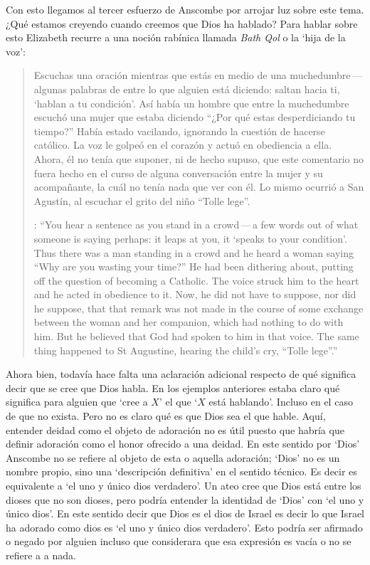 Con esto llegamos al tercer esfuerzo de Anscombe por arrojar luz sobre este tema. ¿Qué estamos creyendo cuando creemos que Dios ha hablado? Para hablar sobre esto Elizabeth recurre a una noción rabínica llamada \emph{Bath Qol} o la `hija de la voz': \blockquote[{\cite[118--119]{anscombe1981erp:faith}}: \enquote{You hear a sentence as you stand in a crowd\,---\,a few words out of what someone is saying perhaps: it leaps at you, it `speaks to your condition'. Thus there was a man standing in a crowd and he heard a woman saying ``Why are you wasting your time?'' He had been dithering about, putting off the question of becoming a Catholic. The voice struck him to the heart and he acted in obedience to it. Now, he did not have to suppose, nor did he suppose, that that remark was not made in the course of some exchange between the woman and her companion, which had nothing to do with him. But he believed that God had spoken to him in that voice. The same thing happened to St Augustine, hearing the child's cry, ``Tolle lege''.}]{Escuchas una oración mientras que estás en medio de una muchedumbre\,---\,algunas palabras de entre lo que alguien está diciendo: saltan hacia ti, `hablan a tu condición'. Así había un hombre que entre la muchedumbre escuchó una mujer que estaba diciendo ``¿Por qué estas desperdiciando tu tiempo?'' Había estado vacilando, ignorando la cuestión de hacerse católico. La voz le golpeó en el corazón y actuó en obediencia a ella. Ahora, él no tenía que suponer, ni de hecho supuso, que este comentario no fuera hecho en el curso de alguna conversación entre la mujer y su acompañante, la cuál no tenía nada que ver con él. Lo mismo ocurrió a San Agustín, al escuchar el grito del niño ``Tolle lege''.}

Ahora bien, todavía hace falta una aclaración adicional respecto de qué significa decir que se cree que Dios habla. En los ejemplos anteriores estaba claro qué significa para alguien que \enquote*{cree a $X$} el que \enquote*{$X$ está hablando}. Incluso en el caso de que no exista. Pero no es claro qué es que Dios sea el que hable. Aquí, entender deidad como el objeto de adoración no es útil puesto que habría que definir adoración como el honor ofrecido a una deidad. En este sentido por `Dios' Anscombe no se refiere al objeto de esta o aquella adoración; `Dios' no es un nombre propio, sino una `descripción definitiva' en el sentido técnico. Es decir es equivalente a `el uno y único dios verdadero'. Un ateo cree que Dios está entre los dioses que no son dioses, pero podría entender la identidad de `Dios' con `el uno y único dios'. En este sentido decir que Dios es el dios de Israel es decir lo que Israel ha adorado como dios es `el uno y único dios verdadero'. Esto podría ser afirmado o negado por alguien incluso que considerara que esa expresión es vacía o no se refiere a a nada.


